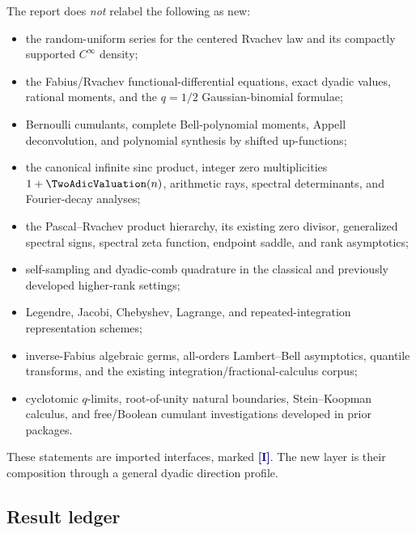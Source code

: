 \documentclass[11pt]{article}
\numberwithin{equation}{section}
\theoremstyle{definition}
\theoremstyle{remark}
\newcommand{\Imported}{\textcolor{navy}{\textsf{\textbf{[I]}}}}
\begin{document}
The report does \emph{not} relabel the following as new:
\begin{itemize}[leftmargin=*]
\item the random-uniform series for the centered Rvachev law and its compactly
      supported $C^\infty$ density;
\item the Fabius/Rvachev functional-differential equations, exact dyadic
      values, rational moments, and the $q=1/2$ Gaussian-binomial formulae;
\item Bernoulli cumulants, complete Bell-polynomial moments, Appell
      deconvolution, and polynomial synthesis by shifted up-functions;
\item the canonical infinite sinc product, integer zero multiplicities
      $1+\TwoAdicValuation(n)$, arithmetic rays, spectral determinants, and Fourier-decay
      analyses;
\item the Pascal--Rvachev product hierarchy, its existing zero divisor,
      generalized spectral signs, spectral zeta function, endpoint saddle, and
      rank asymptotics;
\item self-sampling and dyadic-comb quadrature in the classical and previously
      developed higher-rank settings;
\item Legendre, Jacobi, Chebyshev, Lagrange, and repeated-integration
      representation schemes;
\item inverse-Fabius algebraic germs, all-orders Lambert--Bell asymptotics,
      quantile transforms, and the existing integration/fractional-calculus
      corpus;
\item cyclotomic $q$-limits, root-of-unity natural boundaries, Stein--Koopman
      calculus, and free/Boolean cumulant investigations developed in prior
      packages.
\end{itemize}
These statements are imported interfaces, marked \Imported.  The new layer is
their composition through a general dyadic direction profile.

\subsection{Result ledger}
\end{document}
